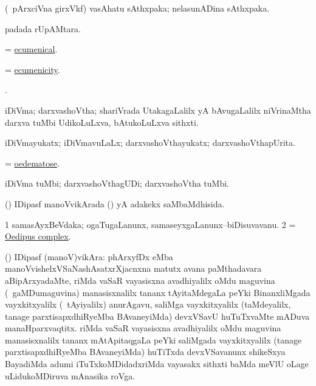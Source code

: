 \bentry
{}
\gl{\nA}
\bmng
(\kanmu\ pArxciVna girxVkf) vasAhatu sAthxpaka; nelasunADina sAthxpaka. 
\emng
\eentry

\bentry
{}
\gl{\nA}
\bmng
{} padada rUpAMtara. 
\emng
\eentry

\bentry
{}
\gl{\gu}
\bmng
= \hyperref{kandict_e.pdf}{E}{ecumenical}{ecumenical}. 
\emng
\eentry

\bentry
{}
\gl{\nA}
\bmng
= \hyperref{kandict_e.pdf}{E}{ecumenicity}{ecumenicity}. 
\emng
\eentry

\bentry
{}
\gl{\saMkiSx}
\bmng
{}. 
\emng
\eentry

\bentry
{}
\gl{\nA}
\bmng
iDiVma; darxvashoVtha; shariVrada UtakagaLalilx yA bAvugaLalilx niVrinaMtha darxva tuMbi UdikoLuLxva, bAtukoLuLxva sithxti. 
\emng
\eentry

\bentry
{}
\gl{\gu}
\bmng
iDiVmayukatx; iDiVmavuLaLx; darxvashoVthayukatx; darxvashoVthapUrita. 
\emng
\eentry

\bentry
{}
\gl{\gu}
\bmng
= \hyperlink{oedematose}{oedematose}. 
\emng
\eentry

\bentry
{}
\gl{\kirxvi}
\bmng
iDiVma tuMbi; darxvashoVthagUDi; darxvashoVtha tuMbi. 
\emng
\eentry

\bentry
{}
\gl{\gu}
\bmng
(\mashA) IDipasf manoVvikArada () yA adakekx saMbaMdhisida. 
\emng
\eentry

\bentry
{}
\gl{\nA}
\bmng
\bnum
\num{1} samasAyxBeVdaka; ogaTugaLanunx, samaseyxgaLanunx--biDisuvavanu. 
\num{2} = \hyperlink{Oedipus complex}{Oedipus complex}. 
\enum
\emng
\eentry

\bentry
{}
\gl{\nA}
\bmng
(\mashA) IDipasf (manoV)vikAra: 
\banum
{} phArxyfDx eMba manoVvishelxVSaNashAsatxrXjacnxna matutx avana paMthadavara aBipArxyadaMte,  riMda  vaSaR vayasisxna avadhiyalilx oMdu maguvina (\kanmu\ gaMDumaguvina) manasisxnalilx tananx tAyitaMdegaLa peYki BinanxliMgada vayxkitxyalilx (\kanmu\ tAyiyalilx) anurAgavu, saliMga vayxkitxyalilx (taMdeyalilx, tanage parxtisapxdhiRyeMba BAvaneyiMda) devxVSavU huTuTxvaMte mADuva manaHparxvaqtitx. 
  riMda  vaSaR vayasisxna avadhiyalilx oMdu maguvina manasisxnalilx tananx mAtApitaqgaLa peYki saliMgada vayxkitxyalilx (tanage parxtisapxdhiRyeMba BAvaneyiMda) huTiTxda devxVSavanunx shikeSxya BayadiMda adumi iTuTxkoMDidadxriMda vayasakx sithxti baMda meVlU oLage uLidukoMDiruva mAnasika roVga. 
\eanum
\emng
\eentry

